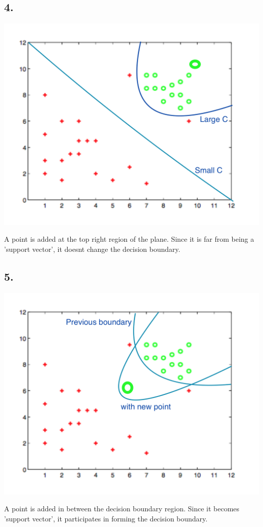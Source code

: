 \documentclass[letterpaper,doc,notimes]{apa6}
\begin{document}
\subsection{4. }
\begin{minipage}{0.5\textwidth} \includegraphics[scale=0.3]{5d} \end{minipage}
\begin{minipage}{0.5\textwidth}\raggedleft
	A point is added at the top right region of the plane. Since it is far from being a 'support vector', it doesnt change the decision boundary.
\end{minipage}

\subsection{5. }
\begin{minipage}{0.5\textwidth} \includegraphics[scale=0.3]{5e} \end{minipage}
\begin{minipage}{0.5\textwidth}\raggedleft
	A point is added in between the decision boundary region. Since it becomes 'support vector', it participates in  forming the decision boundary.
\end{minipage}
\end{document}
